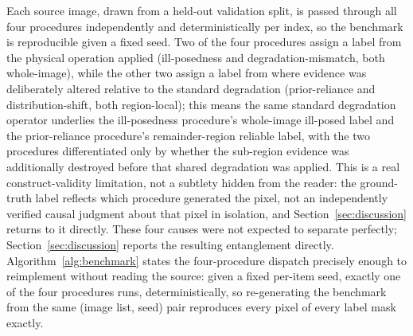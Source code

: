 \documentclass[review]{elsarticle}
\begin{document}
Each source image, drawn from a held-out validation split, is passed through all four procedures independently and deterministically per index, so the benchmark is reproducible given a fixed seed. Two of the four procedures assign a label from the physical operation applied (ill-posedness and degradation-mismatch, both whole-image), while the other two assign a label from where evidence was deliberately altered relative to the standard degradation (prior-reliance and distribution-shift, both region-local); this means the same standard degradation operator underlies the ill-posedness procedure's whole-image ill-posed label and the prior-reliance procedure's remainder-region reliable label, with the two procedures differentiated only by whether the sub-region evidence was additionally destroyed before that shared degradation was applied. This is a real construct-validity limitation, not a subtlety hidden from the reader: the ground-truth label reflects which procedure generated the pixel, not an independently verified causal judgment about that pixel in isolation, and Section~\ref{sec:discussion} returns to it directly. These four causes were not expected to separate perfectly; Section~\ref{sec:discussion} reports the resulting entanglement directly. Algorithm~\ref{alg:benchmark} states the four-procedure dispatch precisely enough to reimplement without reading the source: given a fixed per-item seed, exactly one of the four procedures runs, deterministically, so re-generating the benchmark from the same (image list, seed) pair reproduces every pixel of every label mask exactly.
\end{document}
